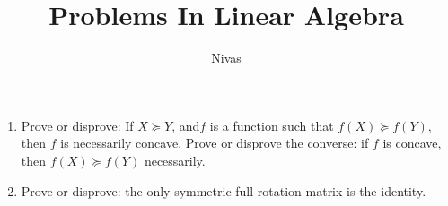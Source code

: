 \documentclass[reqno]{amsart}
\title{Problems In Linear Algebra}
\author{Nivas}
\newcommand{\Geq}{\succeq}
\newcommand{\<}{\prec}
\renewcommand{\>}{\succ}
\begin{document}
\maketitle
\newpage
\begin{enumerate}
\item Prove or disprove: If $X \Geq Y$, and$f$ is a function such that $f(X) \Geq f(Y)$, then $f$ is necessarily concave. Prove or disprove the converse: if $f$ is concave, then $f(X) \Geq f(Y)$ necessarily.
\item Prove or disprove: the only symmetric full-rotation matrix is the identity.
\end{enumerate}
\end{document}
